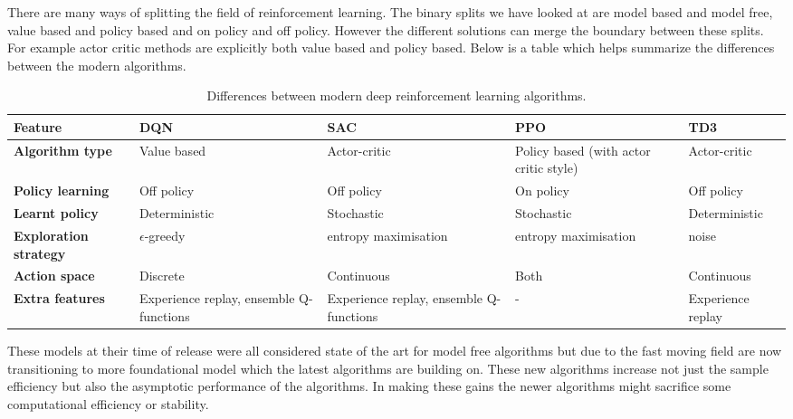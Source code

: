 There are many ways of splitting the field of reinforcement learning. The binary splits we have looked at are model based and model free, value based and policy based and on policy and off policy. However the different solutions can merge the boundary between these splits. For example actor critic methods are explicitly both value based and policy based. Below is a table which helps summarize the differences between the modern algorithms.

\begin{table}[h]
    \footnotesize
    \centering
    \renewcommand{\arraystretch}{1.4} %
    \begin{tabularx}{\textwidth}{p{1.3cm} X X X X}
        \hline
        \textbf{Feature} & \textbf{DQN} & \textbf{SAC} & \textbf{PPO} & \textbf{TD3} \\
        \hline
        \textbf{Algorithm type}       & Value based      & Actor-critic         & Policy based (with actor critic style)              & Actor-critic  \\
        \textbf{Policy learning}      & Off policy        & Off policy           & On policy            & Off policy    \\
        \textbf{Learnt policy}        & Deterministic     & Stochastic           & Stochastic           & Deterministic \\
        \textbf{Exploration strategy} & $\epsilon$-greedy & entropy maximisation & entropy maximisation & noise         \\
        \textbf{Action space}         & Discrete          & Continuous           & Both                 & Continuous    \\
        \textbf{Extra features} & Experience replay, ensemble Q-functions & Experience replay, ensemble Q-functions & - & Experience replay \\
        \hline
    \end{tabularx}
    \caption{Differences between modern deep reinforcement learning algorithms.}
\end{table}

These models at their time of release were all considered state of the art for model free algorithms but due to the fast moving field are now transitioning to more foundational model which the latest algorithms are building on. These new algorithms increase not just the sample efficiency but also the asymptotic performance of the algorithms. In making these gains the newer algorithms might sacrifice some computational efficiency or stability.

